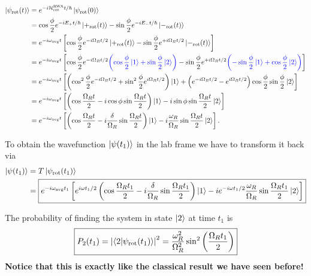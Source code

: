 \documentclass{book}
\theoremstyle{definition}
\newcommand{\psirot}{\ket{\psi_\text{rot}(t)} }
\newcommand{\RWA}{\ham_\text{rot}^\text{RWA}}
\newcommand{\ham}{\mathcal{H}}
\newcommand{\f}[2]{\frac{#1}{#2}}
\newcommand{\lp}{\left(}
\newcommand{\rp}{\right)}
\newcommand{\lb}{\left[}
\newcommand{\rb}{\right]}
\begin{document}
	\begin{align*}
		\psirot 
		&= e^{-i \RWA t/\hbar} \ket{\psi_\text{rot}(0)} \\
		&= \cos\f{\phi}{2}e^{-i E_+ t/\hbar} \ket{+_\text{rot}(t)} -\sin\f{\phi}{2}e^{-i E_- t/\hbar}\ket{-_\text{rot}(t)}\\
		&= e^{-i\omega_\text{avg} t}\lb \cos\f{\phi}{2} e^{-i\Omega_R t/2} \ket{+_\text{rot}(t)} - \sin\f{\phi}{2}e^{+i\Omega_R t/2} \ket{-_\text{rot}(t)} \rb\\
		&= e^{-i\omega_\text{avg} t}\lb \cos\f{\phi}{2} e^{-i\Omega_R t/2} \textcolor{blue}{\lp \cos \f{\phi}{2} \ket{1} + \sin\f{\phi}{2}\ket{2} \rp}- \sin\f{\phi}{2}e^{+i\Omega_R t/2} \textcolor{blue}{\lp -\sin \f{\phi}{2} \ket{1} + \cos\f{\phi}{2}\ket{2}  \rp } \rb \\
		&= e^{-i\omega_\text{avg} t}\lb \lp \cos^2\f{\phi}{2} e^{-i\Omega_R t/2}+\sin^2\f{\phi}{2} e^{i\Omega_R t/2}  \rp \ket{1} + \lp e^{-i\Omega_R t/2} - e^{i\Omega_R t/2}  \rp \cos\f{\phi}{2}\sin\f{\phi}{2}\ket{2} \rb \\
		&= e^{-i\omega_\text{avg} t}\lb \lp \cos\f{\Omega_R t}{2} - i\cos \phi \sin\f{\Omega_R t}{2} \rp \ket{1} - i\sin\phi \sin\f{\Omega_R t}{2} \ket{2} \rb \\
		&= e^{-i\omega_\text{avg}t }\lb \lp \cos\f{\Omega_R t}{2} - i\f{\delta}{\Omega_R} \sin\f{\Omega_R t}{2}   \rp \ket{1} - i\f{\omega_R}{\Omega_R} \sin\f{\Omega_R t}{2} \ket{2}\rb.
	\end{align*}
	
	To obtain the wavefunction $\ket{\psi(t_1)}$ in the lab frame we have to transform it back via
	\begin{align*}
		\ket{\psi(t_1)} &= T \ket{\psi_\text{rot}(t_1)}\\
		&= \boxed{e^{-i\omega_\text{avg}t_1 }\lb e^{i\omega t_1/2} \lp \cos\f{\Omega_R t_1}{2} - i\f{\delta}{\Omega_R} \sin\f{\Omega_R t_1}{2}   \rp \ket{1} - i e^{-i\omega t_1/2}\f{\omega_R}{\Omega_R} \sin\f{\Omega_R t_1}{2} \ket{2}\rb}
	\end{align*}
	
	
	
	
	
	
	
	
	 
	
	
	The probability of finding the system in state $\ket{2}$ at time $t_1$ is 
	\begin{align*}
		\boxed{P_2(t_1) = \abs{\bra{2}\ket{\psi_\text{rot}(t_1)}}^2 = \f{\omega_R^2}{\Omega_R^2}\sin^2 \lp \f{\Omega_R t_1}{2} \rp}
	\end{align*}
	\textbf{Notice that this is exactly like the classical result we have seen before!}\\
	
\end{document}
